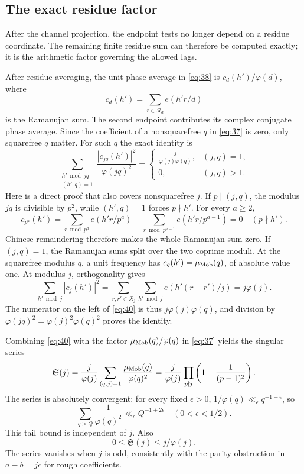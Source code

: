 \subsection{The exact residue factor}

After the channel projection, the endpoint tests no longer depend on a
residue coordinate. The remaining finite residue sum can therefore be
computed exactly; it is the arithmetic factor governing the allowed lags.

After residue averaging, the unit phase average in
\eqref{eq:38} is \(c_d(h')/\varphi(d)\), where
\[
 c_d(h')=\sum_{r\in\mathcal R_d}e(h'r/d)
\]
is the Ramanujan sum.  The second endpoint contributes its complex
conjugate phase average.  Since the coefficient of a nonsquarefree
\(q\) in \eqref{eq:37} is zero, only squarefree \(q\) matter.
For such \(q\) the exact identity is
\begin{equation}\label{eq:40}
 \sum_{\substack{h'\bmod jq\\(h',q)=1}}
       \frac{|c_{jq}(h')|^2}{\varphi(jq)^2}
 =\begin{cases}
 \displaystyle\frac{j}{\varphi(j)\varphi(q)},&(j,q)=1,\\[4pt]
 0,&(j,q)>1.
 \end{cases}
\end{equation}
Here is a direct proof that also covers nonsquarefree \(j\).  If
\(p\mid(j,q)\), the modulus \(jq\) is divisible by \(p^2\), while
\((h',q)=1\) forces \(p\nmid h'\).  For every \(a\ge2\),
\[
 c_{p^a}(h')
 =\sum_{r\bmod p^a}e(h'r/p^a)
   -\sum_{r\bmod p^{a-1}}e(h'r/p^{a-1})=0
 \quad(p\nmid h').
\]
Chinese remaindering therefore makes the whole Ramanujan sum zero.
If \((j,q)=1\), the Ramanujan sums split over the two coprime
moduli.  At the squarefree modulus \(q\), a unit frequency has
\(c_q(h')=\mu_{\rm Mob}(q)\), of absolute value one.  At modulus
\(j\), orthogonality gives
\[
 \sum_{h'\bmod j}|c_j(h')|^2
 =\sum_{r,r'\in\mathcal R_j}
        \sum_{h'\bmod j}e(h'(r-r')/j)=j\varphi(j).
\]
The numerator on the left of \eqref{eq:40} is thus
\(j\varphi(j)\varphi(q)\), and division by
\(\varphi(jq)^2=\varphi(j)^2\varphi(q)^2\) proves the identity.

Combining \eqref{eq:40} with the factor
\(\mu_{\rm Mob}(q)/\varphi(q)\) in \eqref{eq:37} yields the
singular series
\begin{equation}\label{eq:41}
 \mathfrak S(j)
 =\frac j{\varphi(j)}
       \sum_{(q,j)=1}\frac{\mu_{\rm Mob}(q)}{\varphi(q)^2}
 =\frac j{\varphi(j)}
       \prod_{p\nmid j}\left(1-\frac1{(p-1)^2}\right).
\end{equation}
The series is absolutely convergent: for every fixed
\(\epsilon>0\), \(1/\varphi(q)\ll_\epsilon q^{-1+\epsilon}\), so
\[
 \sum_{q>Q}\frac1{\varphi(q)^2}
 \ll_\epsilon Q^{-1+2\epsilon}
 \quad(0<\epsilon<1/2).
\]
This tail bound is independent of \(j\).  Also
\[
 0\le\mathfrak S(j)\le j/\varphi(j).
\]
The series vanishes when \(j\) is odd, consistently with the parity
obstruction in \(a-b=jc\) for rough coefficients.

